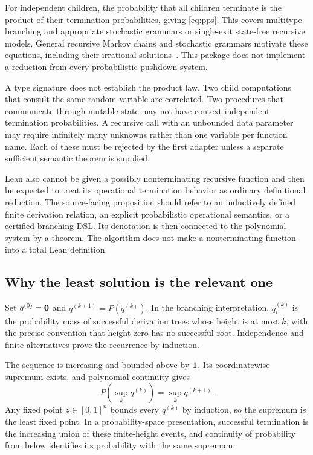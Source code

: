 For independent children, the probability that all children terminate is the product of their termination probabilities, giving \eqref{eq:pps}. This covers multitype branching and appropriate stochastic grammars or single-exit state-free recursive models. General recursive Markov chains and stochastic grammars motivate these equations, including their irrational solutions~\cite{etessami-yannakakis}. This package does not implement a reduction from every probabilistic pushdown system.

A type signature does not establish the product law. Two child computations that consult the same random variable are correlated. Two procedures that communicate through mutable state may not have context-independent termination probabilities. A recursive call with an unbounded data parameter may require infinitely many unknowns rather than one variable per function name. Each of these must be rejected by the first adapter unless a separate sufficient semantic theorem is supplied.

Lean also cannot be given a possibly nonterminating recursive function and then be expected to treat its operational termination behavior as ordinary definitional reduction. The source-facing proposition should refer to an inductively defined finite derivation relation, an explicit probabilistic operational semantics, or a certified branching DSL. Its denotation is then connected to the polynomial system by a theorem. The algorithm does not make a nonterminating function into a total Lean definition.

\subsection{Why the least solution is the relevant one}
Set $q^{(0)}=\mathbf 0$ and $q^{(k+1)}=P(q^{(k)})$. In the branching interpretation, $q^{(k)}_i$ is the probability mass of successful derivation trees whose height is at most $k$, with the precise convention that height zero has no successful root. Independence and finite alternatives prove the recurrence by induction.

The sequence is increasing and bounded above by $\mathbf 1$. Its coordinatewise supremum exists, and polynomial continuity gives
\[
 P\!\left(\sup_k q^{(k)}\right)=\sup_k q^{(k+1)}.
\]
Any fixed point $z\in[0,1]^n$ bounds every $q^{(k)}$ by induction, so the supremum is the least fixed point. In a probability-space presentation, successful termination is the increasing union of these finite-height events, and continuity of probability from below identifies its probability with the same supremum.


